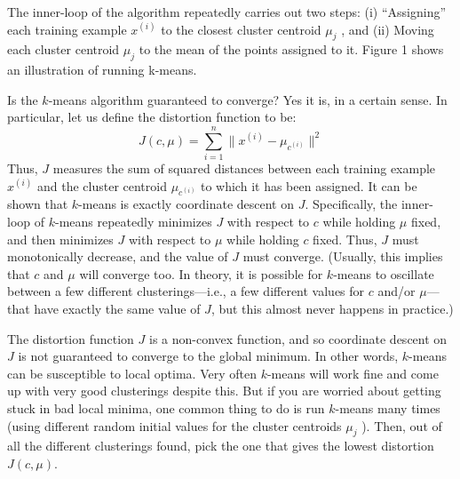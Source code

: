 The inner-loop of the algorithm repeatedly carries out two steps: (i)
``Assigning'' each training example $x^{(i)}$ to the closest cluster centroid $\mu_j$ , and
(ii) Moving each cluster centroid $\mu_j$ to the mean of the points assigned to it.
Figure 1 shows an illustration of running k-means.

Is the $k$-means algorithm guaranteed to converge? Yes it is, in a certain
sense. In particular, let us define the distortion function to be:
\begin{equation*}
    J(c,\mu) = \sum^n_{i=1} \lVert x^{(i)} - \mu_{c^{(i)}} \rVert^2
\end{equation*}
Thus, $J$ measures the sum of squared distances between each training
example $x^{(i)}$ and the cluster centroid $\mu_{c^{(i)}}$ to which it has been assigned. It can
be shown that $k$-means is exactly coordinate descent on $J$. Specifically, the
inner-loop of $k$-means repeatedly minimizes $J$ with respect to $c$ while holding
$\mu$ fixed, and then minimizes $J$ with respect to $\mu$ while holding $c$ fixed. Thus,
$J$ must monotonically decrease, and the value of $J$ must converge. (Usually,
this implies that $c$ and $\mu$ will converge too. In theory, it is possible for
$k$-means to oscillate between a few different clusterings---i.e., a few different
values for $c$ and/or $\mu$---that have exactly the same value of $J$, but this almost
never happens in practice.)

The distortion function $J$ is a non-convex function, and so coordinate
descent on $J$ is not guaranteed to converge to the global minimum. In other
words, $k$-means can be susceptible to local optima. Very often $k$-means will
work fine and come up with very good clusterings despite this. But if you
are worried about getting stuck in bad local minima, one common thing to
do is run $k$-means many times (using different random initial values for the
cluster centroids $\mu_j$ ). Then, out of all the different clusterings found, pick
the one that gives the lowest distortion $J(c,\mu)$.



